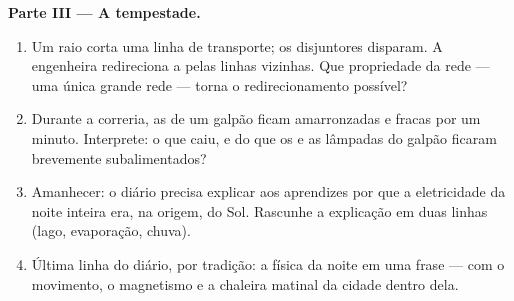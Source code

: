 \begin{problem}
\medskip\noindent\textbf{Parte III --- A tempestade.}
\begin{enumerate}[resume]
  \item Um raio corta uma linha de transporte; os disjuntores
        disparam. A engenheira redireciona a  pelas linhas
        vizinhas. Que propriedade da rede --- uma única grande rede
         --- torna o redirecionamento possível?
  \item Durante a correria, as  de um galpão ficam
        amarronzadas e fracas por um minuto. Interprete: o que caiu,
        e do que os  e as lâmpadas do galpão ficaram
        brevemente subalimentados?
  \item Amanhecer: o diário precisa explicar aos aprendizes por que
        a eletricidade da noite inteira era, na origem,  do Sol.
        Rascunhe a explicação em duas linhas (lago, evaporação,
        chuva).
  \item Última linha do diário, por tradição: a física da noite em
        uma frase --- com o movimento, o magnetismo e a chaleira
        matinal da cidade dentro dela.
\end{enumerate}
\end{problem}
